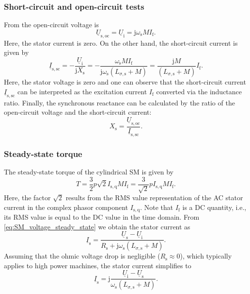 \begin{frame}
	\frametitle{Short-circuit and open-circuit tests}
	From  the open-circuit voltage is
	\begin{equation}
		\underline{U}_\mathrm{s,oc} = \underline{U}_\mathrm{i} = \mathrm{j} \omega_\mathrm{s} M I_\mathrm{f}.
	\end{equation}
	Here, the stator current is zero. \pause On the other hand, the short-circuit current is given by
	\begin{equation}
		\underline{I}_\mathrm{s,sc} = -\frac{\underline{U}_\mathrm{i}}{\mathrm{j}X_\mathrm{s}} = -\frac{\omega_\mathrm{s} M I_\mathrm{f}}{\mathrm{j}\omega_\mathrm{s}\left(L_{\sigma,\mathrm{s}} + M\right)} = \frac{\mathrm{j} M}{\left(L_{\sigma,\mathrm{s}} + M\right)}I_\mathrm{f}.
	\end{equation}
	Here, the stator voltage is zero and one can observe that the short-circuit current $\underline{I}_\mathrm{s,sc}$ can be interpreted as the excitation current $I_\mathrm{f}$ converted via the inductance ratio. \pause Finally, the synchronous reactance can be calculated by the ratio of the open-circuit voltage and the short-circuit current:
	\begin{equation}
		X_\mathrm{s} = \frac{\underline{U}_\mathrm{s,oc}}{\underline{I}_\mathrm{s,sc}}.
	\end{equation}
\end{frame}

\begin{frame}
	\frametitle{Steady-state torque}
	The steady-state torque of the cylindrical SM is given by
	$$ T = \frac{3}{2} p \sqrt{2}I_\mathrm{s,q} M I_\mathrm{f} = \frac{3}{\sqrt{2}} p I_\mathrm{s,q} M I_\mathrm{f}.$$
	\pause
	Here, the factor $\sqrt{2}$ results from the RMS value representation of the AC stator current in the complex phasor component $I_\mathrm{s,q}$.  Note that $I_\mathrm{f}$ is a DC quantity, i.e., its RMS value is equal to the DC value in the time domain. \pause
	From \eqref{eq:SM_voltage_steady_state} we obtain the stator current as
	\begin{equation}
		\underline{I}_\mathrm{s} = \frac{\underline{U}_\mathrm{s} - \underline{U}_\mathrm{i}}{R_\mathrm{s} + \mathrm{j}\omega_\mathrm{s} \left(L_{\sigma,\mathrm{s}} + M\right)}.
	\end{equation}
	\pause
	Assuming that the ohmic voltage drop is negligible ($R_\mathrm{s}\approx 0$), which typically applies to high power machines, the stator current simplifies to
	\begin{equation}
		\underline{I}_\mathrm{s} = \mathrm{j} \frac{\underline{U}_\mathrm{i} - \underline{U}_\mathrm{s}}{\omega_\mathrm{s} \left(L_{\sigma,\mathrm{s}} + M\right)}.
		\label{eq:SM_stator_current_steady_state}
	\end{equation}
\end{frame}

